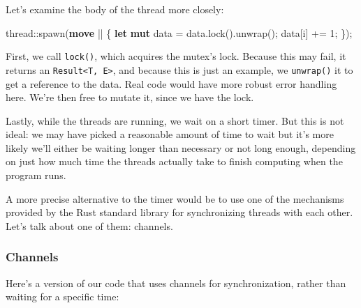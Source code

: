 \documentclass[a4paper,]{book}
\newenvironment{Shaded}{\begin{snugshade}}{\end{snugshade}}
\newcommand{\KeywordTok}[1]{\textcolor[rgb]{0.13,0.29,0.53}{\textbf{{#1}}}}
\newcommand{\DecValTok}[1]{\textcolor[rgb]{0.00,0.00,0.81}{{#1}}}
\newcommand{\NormalTok}[1]{{#1}}
\begin{document}
Let's examine the body of the thread more closely:

\begin{Shaded}
\begin{Highlighting}[]
\NormalTok{thread::spawn(}\KeywordTok{move} \NormalTok{|| \{}
    \KeywordTok{let} \KeywordTok{mut} \NormalTok{data = data.lock().unwrap();}
    \NormalTok{data[i] += }\DecValTok{1}\NormalTok{;}
\NormalTok{\});}
\end{Highlighting}
\end{Shaded}

First, we call \texttt{lock()}, which acquires the mutex's lock. Because
this may fail, it returns an
\texttt{Result\textless{}T,\ E\textgreater{}}, and because this is just
an example, we \texttt{unwrap()} it to get a reference to the data. Real
code would have more robust error handling here. We're then free to
mutate it, since we have the lock.

Lastly, while the threads are running, we wait on a short timer. But
this is not ideal: we may have picked a reasonable amount of time to
wait but it's more likely we'll either be waiting longer than necessary
or not long enough, depending on just how much time the threads actually
take to finish computing when the program runs.

A more precise alternative to the timer would be to use one of the
mechanisms provided by the Rust standard library for synchronizing
threads with each other. Let's talk about one of them: channels.

\subsubsection{Channels}\label{channels}

Here's a version of our code that uses channels for synchronization,
rather than waiting for a specific time:
\end{document}
